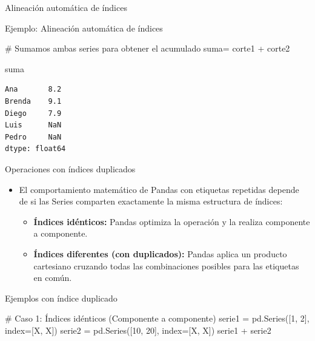 \documentclass[
  ignorenonframetext,
  aspectratio=169,
  spanish,
]{beamer}
\newenvironment{Shaded}{\begin{snugshade}}{\end{snugshade}}
\newcommand{\CommentTok}[1]{\textcolor[rgb]{0.37,0.37,0.37}{#1}}
\newcommand{\DecValTok}[1]{\textcolor[rgb]{0.68,0.00,0.00}{#1}}
\newcommand{\NormalTok}[1]{\textcolor[rgb]{0.00,0.23,0.31}{#1}}
\newcommand{\OperatorTok}[1]{\textcolor[rgb]{0.37,0.37,0.37}{#1}}
\newcommand{\StringTok}[1]{\textcolor[rgb]{0.13,0.47,0.30}{#1}}
\providecommand{\tightlist}{%
  \setlength{\itemsep}{0pt}\setlength{\parskip}{0pt}}
\newcommand*\circled[1]{\tikz[baseline=(char.base)]{
          \node[shape=circle,draw,inner sep=1pt] (char) {{\scriptsize#1}};}}
\begin{document}
\begin{frame}[fragile]{Alineación automática de índices}
\begin{block}{Ejemplo: Alineación automática de índices}
\begin{Shaded}
\begin{Highlighting}[]
\CommentTok{\# Sumamos ambas series para obtener el acumulado}
\NormalTok{suma}\OperatorTok{=}\NormalTok{ corte1 }\OperatorTok{+}\NormalTok{ corte2 }\hspace*{\fill}\NormalTok{\circled{1}}

\NormalTok{suma }
\end{Highlighting}
\end{Shaded}

\begin{verbatim}
Ana       8.2
Brenda    9.1
Diego     7.9
Luis      NaN
Pedro     NaN
dtype: float64
\end{verbatim}
\end{block}

\begin{block}{Operaciones con índices duplicados}
\label{operaciones-con-uxedndices-duplicados}

\begin{itemize}
\tightlist
\item
  El comportamiento matemático de Pandas con etiquetas repetidas depende
  de si las Series comparten exactamente la misma estructura de índices:

  \begin{itemize}
  \tightlist
  \item
    \textbf{Índices idénticos:} Pandas optimiza la operación y la
    realiza componente a componente.
  \item
    \textbf{Índices diferentes (con duplicados):} Pandas aplica un
    producto cartesiano cruzando todas las combinaciones posibles para
    las etiquetas en común.
  \end{itemize}
\end{itemize}
\end{block}

\begin{block}{Ejemplos con índice duplicado}
\label{ejemplos-con-uxedndice-duplicado}
\label{annotated-cell-21}%
\begin{Shaded}
\begin{Highlighting}[]
\CommentTok{\# Caso 1: Índices idénticos (Componente a componente)}
\NormalTok{serie1 }\OperatorTok{=}\NormalTok{ pd.Series([}\DecValTok{1}\NormalTok{, }\DecValTok{2}\NormalTok{], index}\OperatorTok{=}\NormalTok{[}\StringTok{\textquotesingle{}X\textquotesingle{}}\NormalTok{, }\StringTok{\textquotesingle{}X\textquotesingle{}}\NormalTok{])}
\NormalTok{serie2 }\OperatorTok{=}\NormalTok{ pd.Series([}\DecValTok{10}\NormalTok{, }\DecValTok{20}\NormalTok{], index}\OperatorTok{=}\NormalTok{[}\StringTok{\textquotesingle{}X\textquotesingle{}}\NormalTok{, }\StringTok{\textquotesingle{}X\textquotesingle{}}\NormalTok{])}
\NormalTok{serie1 }\OperatorTok{+}\NormalTok{ serie2 }\hspace*{\fill}\NormalTok{\circled{1}}


\end{Highlighting}
\end{Shaded}
\end{block}
\end{frame}
\end{document}
